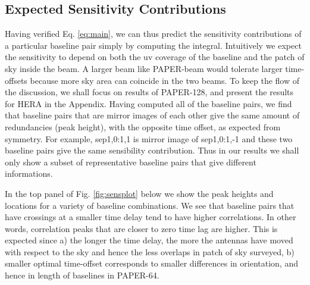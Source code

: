 \documentclass[preprint2,numberedappendix,tighten,twocolappendix]{aastex6}  %
\renewcommand\[{\begin{equation}}
\renewcommand\]{\end{equation}}
\begin{document}
\subsection{Expected Sensitivity Contributions}

Having verified Eq. \eqref{eq:main}, we can thus predict the sensitivity contributions of a
particular baseline pair simply by computing the integral. 
Intuitively we expect the sensitivity to depend on both the uv coverage of the baseline and the patch of sky inside the beam. A larger beam like PAPER-beam would tolerate larger time-offsets because more sky area can coincide in the two beams. To keep the flow of the discussion, we shall focus on results of PAPER-128, and present the results for HERA in the Appendix. 
Having computed all of the baseline pairs, we find that baseline pairs that are mirror images of each other 
give the same amount of redundancies (peak height), with the opposite time offset, as expected from symmetry. 
For example, sep1,0:1,1 is mirror image of sep1,0:1,-1 and these two baseline pairs
give the same sensibility contribution. Thus in our results we shall only show a subset of representative baseline pairs 
that give different informations. 

In the top panel of Fig. \eqref{fig:sensplot} below
we show the peak heights and locations for a variety of baseline combinations.
We see that baseline pairs that have crossings at a smaller time delay
tend to have higher correlations. In other words, correlation peaks
that are closer to zero time lag are higher. This is expected since
a) the longer the time delay, the more the antennas have moved with respect
to the sky and hence the less overlaps in patch of sky surveyed, b) smaller optimal
time-offset corresponds to smaller differences in orientation, and hence in length of
baselines in PAPER-64. 
\end{document}

